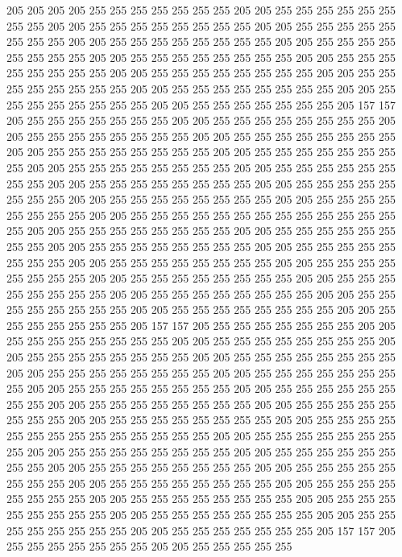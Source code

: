 205 205 205 205 255 255 255 255 255 255 255 205 205 255 255 255 255 255 255 255
255 205 205 255 255 255 255 255 255 255 255 205 205 255 255 255 255 255 255 255
255 205 205 255 255 255 255 255 255 255 255 205 205 255 255 255 255 255 255 255
255 205 205 255 255 255 255 255 255 255 255 205 205 255 255 255 255 255 255 255
255 205 205 255 255 255 255 255 255 255 255 205 205 255 255 255 255 255 255 255
255 205 205 255 255 255 255 255 255 255 255 205 205 255 255 255 255 255 255 255
255 205 205 255 255 255 255 255 255 255 205 157 157 205 255 255 255 255 255 255
255 205 205 255 255 255 255 255 255 255 255 205 205 255 255 255 255 255 255 255
255 205 205 255 255 255 255 255 255 255 255 205 205 255 255 255 255 255 255 255
255 205 205 255 255 255 255 255 255 255 255 205 205 255 255 255 255 255 255 255
255 205 205 255 255 255 255 255 255 255 255 205 205 255 255 255 255 255 255 255
255 205 205 255 255 255 255 255 255 255 255 205 205 255 255 255 255 255 255 255
255 205 205 255 255 255 255 255 255 255 255 205 205 255 255 255 255 255 255 255
255 255 255 255 255 255 255 205 205 255 255 255 255 255 255 255 255 205 205 255
255 255 255 255 255 255 255 205 205 255 255 255 255 255 255 255 255 205 205 255
255 255 255 255 255 255 255 205 205 255 255 255 255 255 255 255 255 205 205 255
255 255 255 255 255 255 255 205 205 255 255 255 255 255 255 255 255 205 205 255
255 255 255 255 255 255 255 205 205 255 255 255 255 255 255 255 255 205 205 255
255 255 255 255 255 255 255 205 205 255 255 255 255 255 255 255 255 205 205 255
255 255 255 255 255 255 205 157 157 205 255 255 255 255 255 255 255 205 205 255
255 255 255 255 255 255 255 205 205 255 255 255 255 255 255 255 255 205 205 255
255 255 255 255 255 255 255 205 205 255 255 255 255 255 255 255 255 205 205 255
255 255 255 255 255 255 255 205 205 255 255 255 255 255 255 255 255 205 205 255
255 255 255 255 255 255 255 205 205 255 255 255 255 255 255 255 255 205 205 255
255 255 255 255 255 255 255 205 205 255 255 255 255 255 255 255 255 205 205 255
255 255 255 255 255 255 255 205 205 255 255 255 255 255 255 255 255 255 255 255
255 255 255 205 205 255 255 255 255 255 255 255 255 205 205 255 255 255 255 255
255 255 255 205 205 255 255 255 255 255 255 255 255 205 205 255 255 255 255 255
255 255 255 205 205 255 255 255 255 255 255 255 255 205 205 255 255 255 255 255
255 255 255 205 205 255 255 255 255 255 255 255 255 205 205 255 255 255 255 255
255 255 255 205 205 255 255 255 255 255 255 255 255 205 205 255 255 255 255 255
255 255 255 205 205 255 255 255 255 255 255 255 255 205 205 255 255 255 255 255
255 255 205 157 157 205 255 255 255 255 255 255 255 205 205 255 255 255 255 255
